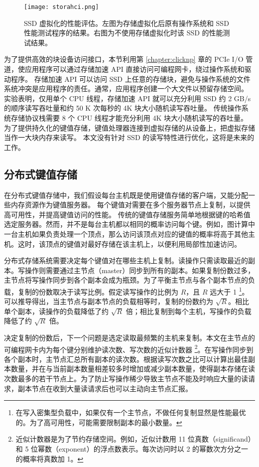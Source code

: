 \begin{figure}[htbp]
	\centering
	\texttt{[image: storahci.png]}
	\caption{SSD 虚拟化的性能评估。左图为存储虚拟化后原有操作系统和 SSD 性能测试程序的结果。右图为不使用存储虚拟化时该 SSD 的性能测试结果。}
	\label{kvdirect:fig:ssd-benchmark}
\end{figure}

为了提供高效的块设备访问接口，本节利用第 \ref{chapter:clicknp} 章的 PCIe I/O 管道，使应用程序可以通过存储加速 API 直接访问可编程网卡，绕过操作系统和驱动程序。
存储加速 API 可以访问 SSD 上任意的存储块，避免与操作系统的文件系统冲突是应用程序的责任。通常，应用程序创建一个大文件以预留存储空间。
实验表明，仅用单个 CPU 线程，存储加速 API 就可以充分利用 SSD 约 2 GB/s 的顺序读写吞吐量和约 50 K 次每秒的 4K 块大小随机读写吞吐量。
传统操作系统存储协议栈需要 8 个 CPU 线程才能充分利用 4K 块大小随机读写的吞吐量。
为了提供持久化的键值存储，键值处理器连接到虚拟存储的从设备上，把虚拟存储当作一大块内存来读写。
本文没有针对 SSD 的读写特性进行优化，这将是未来的工作。






\subsection{分布式键值存储}

在分布式键值存储中，我们假设每台主机既是使用键值存储的客户端，又能分配一些内存资源作为键值服务器。
每个键值对需要在多个服务器节点上复制，以提供高可用性，并提高键值访问的性能。
传统的键值存储服务简单地根据键的哈希值选定服务器。然而，并不是每台主机都以相同的概率访问每个键。例如，图计算中一台主机如果负责处理一个顶点，那么访问该顶点对应的键值的概率将高于其他主机。这时，该顶点的键值对最好存储在该主机上，以便利用局部性加速访问。

分布式存储系统需要决定每个键值对在哪些主机上复制。读操作只需读取最近的副本。写操作则需要通过主节点（master）同步到所有的副本。如果复制份数过多，主节点将写操作同步到各个副本会成为瓶颈。为了平衡主节点与各个副本节点的负载，复制的份数取决于读写比例。假定读写操作的比例为 $R$，且 $R$ 远大于 1 \footnote{在写入密集型负载中，如果仅有一个主节点，不做任何复制显然是性能最优的。为了高可用性，可能需要限制副本的最小数量。}。可以推导得出，当主节点与副本节点的负载相等时，复制的份数约为 $\sqrt{R}$。相比单个副本，读操作的负载降低了约 $\sqrt{R}$ 倍；相比复制到每个主机，写操作的负载降低了约 $\sqrt{R}$ 倍。

决定复制的份数后，下一个问题是选定读取最频繁的主机来复制。本文在主节点的可编程网卡内为每个键分别维护读次数、写次数的近似计数器 \footnote{近似计数器是为了节约存储空间。例如，近似计数用 11 位真数（significand）和 5 位幂数（exponent）的浮点数表示。每次访问时以 2 的幂数次方分之一的概率将真数加 1。}。在写操作同步到各个副本时，主节点汇总所有副本的读次数。根据读写次数之比可以计算出最佳副本数量，并在与当前副本数量相差较多时增加或减少副本数量，使得副本存储在读次数最多的若干节点上。为了防止写操作稀少导致主节点不能及时响应大量的读请求，副本节点在收到大量读请求后也可以主动向主节点汇报。

